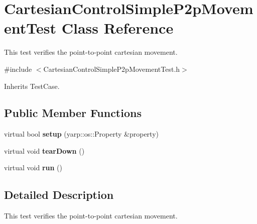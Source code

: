 \section{Cartesian\+Control\+Simple\+P2p\+Movement\+Test Class Reference}
\label{classCartesianControlSimpleP2pMovementTest}


This test verifies the point-\/to-\/point cartesian movement.  




{\ttfamily \#include $<$Cartesian\+Control\+Simple\+P2p\+Movement\+Test.\+h$>$}



Inherits Test\+Case.

\subsection*{Public Member Functions}
\begin{DoxyCompactItemize}
\item 
\mbox{\label{classCartesianControlSimpleP2pMovementTest_a9e6f25e238962dbdc3eb10186bb9fd33}} 
virtual bool {\bfseries setup} (yarp\+::os\+::\+Property \&property)
\item 
\mbox{\label{classCartesianControlSimpleP2pMovementTest_aa4c07cd7b9bdb954df333387d5d1e200}} 
virtual void {\bfseries tear\+Down} ()
\item 
\mbox{\label{classCartesianControlSimpleP2pMovementTest_af6579692f5c18efea453fbb38092281d}} 
virtual void {\bfseries run} ()
\end{DoxyCompactItemize}


\subsection{Detailed Description}
This test verifies the point-\/to-\/point cartesian movement. 

